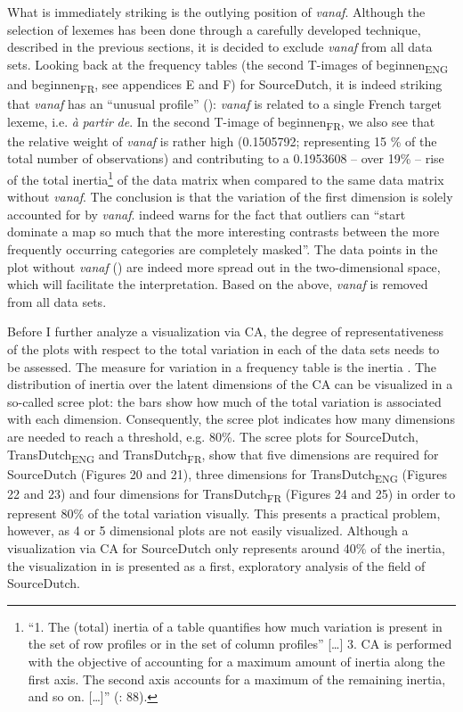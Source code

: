 What is immediately striking is the outlying position of \textit{vanaf}. Although the selection of lexemes has been done through a carefully developed technique, described in the previous sections, it is decided to exclude \textit{vanaf} from all data sets. Looking back at the frequency tables (the second T-images of beginnen\textsubscript{ENG} and beginnen\textsubscript{FR}, see appendices E and F) for SourceDutch, it is indeed striking that \textit{vanaf} has an “unusual profile” (\citealt[92]{greenacre_correspondence_2007}): \textit{vanaf} is related to a single French target lexeme, i.e. \textit{à} \textit{partir} \textit{de}. In the second T-image of beginnen\textsubscript{FR}, we also see that the relative weight of \textit{vanaf} is rather high (0.1505792; representing 15 \% of the total number of observations) and contributing to a 0.1953608 – over 19\% – rise of the total inertia\footnote{“1. The (total) inertia of a table quantifies how much variation is present in the set of row profiles or in the set of column profiles” […] 3. CA is performed with the objective of accounting for a maximum amount of inertia along the first axis. The second axis accounts for a maximum of the remaining inertia, and so on. […]” (\citealt{greenacre_correspondence_2007}: 88).} of the data matrix when compared to the same data matrix without \textit{vanaf}. The conclusion is that the variation of the first dimension is solely accounted for by \textit{vanaf}. \citet[92]{greenacre_correspondence_2007} indeed warns for the fact that outliers can “start dominate a map so much that the more interesting contrasts between the more frequently occurring categories are completely masked”. The data points in the plot without \textit{vanaf} () are indeed more spread out in the two-dimensional space, which will facilitate the interpretation. Based on the above, \textit{vanaf} is removed from all data sets.



Before I further analyze a visualization via CA, the degree of representativeness of the plots with respect to the total variation in each of the data sets needs to be assessed. The measure for variation in a frequency table is the inertia \citep{greenacre_correspondence_2007}. The distribution of inertia over the latent dimensions of the CA can be visualized in a so-called scree plot: the bars show how much of the total variation is associated with each dimension. Consequently, the scree plot indicates how many dimensions are needed to reach a threshold, e.g. 80\%. The scree plots for SourceDutch, TransDutch\textsubscript{ENG} and TransDutch\textsubscript{FR}, show that five dimensions are required for SourceDutch (Figures 20 and 21), three dimensions for TransDutch\textsubscript{ENG} (Figures 22 and 23) and four dimensions for TransDutch\textsubscript{FR} (Figures 24 and 25) in order to represent 80\% of the total variation visually. This presents a practical problem, however, as 4 or 5 dimensional plots are not easily visualized. Although a visualization via CA for SourceDutch only represents around 40\% of the inertia, the visualization in  is presented as a first, exploratory analysis of the field of SourceDutch.

